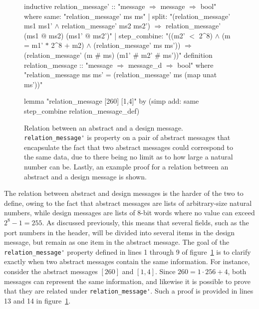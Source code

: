 \documentclass[twoside]{memoir}
\begin{document}
\begin{figure}[h]
    \centering
\begin{nlisting}
inductive relation_message' :: "message $\Rightarrow$ message $\Rightarrow$ bool" where
same:         "relation_message' ms ms" |
split:        "(relation_message' ms1 ms1' $\land$
                relation_message' ms2 ms2') $\Longrightarrow$
               relation_message' (ms1 $@$ ms2) (ms1' $@$ ms2')" |
step_combine: "((m2' $<$ 2^8) $\land$
                (m = m1' $*$ 2^8 $+$ m2) $\land$
                (relation_message' ms ms')) $\Longrightarrow$ 
               (relation_message' (m $\#$ ms) (m1' $\#$ m2' $\#$ ms'))"
definition relation_message :: "message $\Rightarrow$ message_d $\Rightarrow$ bool" where
  "relation_message ms ms' = (relation_message' ms (map unat ms'))"

lemma "relation_message [260] [1,4]"
  by (simp add: same step_combine relation_message_def)
\end{nlisting}
    \caption{Relation between an abstract and a design message.
    \lstinline{relation_message'} is property on a pair of abstract
    messages that encapsulate the fact that two abstract messages could
    correspond to the same data, due to there being no limit as to how large a natural number can be.
    Lastly, an example proof for a relation between an abstract and a design message is shown.
    }
    \label{fig:rel-msg}
\end{figure}

The relation between abstract and design messages is the harder of the two to define,
owing to the fact that abstract messages are lists of arbitrary-size natural numbers, while
design messages are lists of 8-bit words where no value can exceed
$2^8-1 = 255$.
As discussed previously, this means that several fields, such as the port numbers in the header,
will be divided into several items in the design message, but remain as one item in the abstract
message.
The goal of the \lstinline{relation_message'} property defined in lines 1 through 9 of
figure~\ref{fig:rel-msg} is to clarify exactly when two abstract messages contain the same
information.
For instance, consider the abstract messages $[260]$ and $[1, 4]$.
Since $260 = 1 \cdot 256 + 4$, both messages can represent the same information,
and likewise it is possible to prove that they are related under \lstinline{relation_message'}.
Such a proof is provided in lines 13 and 14 in figure~\ref{fig:rel-msg}.
\end{document}
